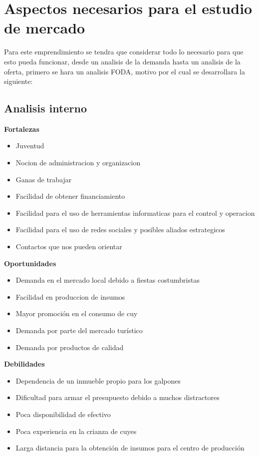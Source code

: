 \documentclass[11pt]{article}
\begin{document}
\section{Aspectos necesarios para el estudio de mercado}
Para este emprendimiento se tendra que considerar todo lo necesario para que esto pueda funcionar, desde un analisis de la demanda hasta un analisis de la oferta, primero se hara un analisis FODA, motivo por el cual se desarrollara la siguiente:
\subsection{Analisis interno}

\textbf{Fortalezas}
\begin{itemize}
	\item Juventud
	\item Nocion de administracion y organizacion
	\item Ganas de trabajar
	\item Facilidad de obtener financiamiento
	\item Facilidad para el uso de herramientas informaticas para el control y operacion
	\item Facilidad para el uso de redes sociales y posibles aliados estrategicos
    \item Contactos que nos pueden orientar
\end{itemize}

\textbf{Oportunidades}
\begin{itemize}
	\item Demanda en el mercado local debido a fiestas costumbristas
	\item Facilidad en produccion de insumos
	\item Mayor promoción en el consumo de cuy
	\item Demanda por parte del mercado turístico 
	\item Demanda por productos de calidad
\end{itemize}

\textbf{Debilidades}
\begin{itemize}
	\item Dependencia de un inmueble propio para los galpones
	\item Dificultad para armar el presupuesto debido a muchos distractores
	\item Poca disponibilidad de efectivo
	\item Poca experiencia en la crianza de cuyes
	\item Larga distancia para la obtención de insumos para el centro de producción 
\end{itemize}
\end{document}
